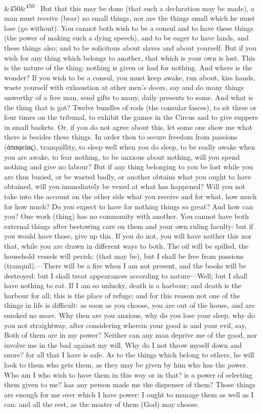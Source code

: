 \documentclass[12pt]{article}
\newcommand{\para}[1][]{\par\noindent\ifx&#1&\else\textsuperscript{\footnotesize #1}~\fi}
\begin{document}
\para[450] But that this may be done (that such a declaration may be made), a man must receive (bear) no small things, nor are the things small which he must lose (go without). You cannot both wish to be a consul and to have these things (the power of making such a dying speech), and to be eager to have lands, and these things also; and to be solicitous about slaves and about yourself. But if you wish for any thing which belongs to another, that which is your own is lost. This is the nature of the thing: nothing is given or had for nothing. And where is the wonder? If you wish to be a consul, you must keep awake, run about, kiss hands, waste yourself with exhaustion at other men's doors, say and do many things unworthy of a free man, send gifts to many, daily presents to some. And what is the thing that is got? Twelve bundles of rods (the consular fasces), to sit three or four times on the tribunal, to exhibit the games in the Circus and to give suppers in small baskets. Or, if you do not agree about this, let some one show me what there is besides these things. In order then to secure freedom from passions (ἀπαφείας), tranquillity, to sleep well when you do sleep, to be really awake when you are awake, to fear nothing, to be anxious about nothing, will you spend nothing and give no labour? But if any thing belonging to you be lost while you are thus busied, or be wasted badly, or another obtains what you ought to have obtained, will you immediately be vexed at what has happened? Will you not take into the account on the other side what you receive and for what, how much for how much? Do you expect to have for nothing things so great? And how can you? One work (thing) has no community with another. You cannot have both external things after bestowing care on them and your own ruling faculty: but if you would have those, give up this. If you do not, you will have neither this nor that, while you are drawn in different ways to both. The oil will be spilled, the household vessels will perish: (that may be), but I shall be free from passions (tranquil).—There will be a fire when I am not present, and the books will be destroyed: but I shall treat appearances according to nature—Well; but I shall have nothing to eat. If I am so unlucky, death is a harbour; and death is the harbour for all; this is the place of refuge; and for this reason not one of the things in life is difficult: as soon as you choose, you are out of the house, and are smoked no more. Why then are you anxious, why do you lose your sleep, why do you not straightway, after considering wherein your good is and your evil, say, Both of them are in my power? Neither can any man deprive me of the good, nor involve me in the bad against my will. Why do I not throw myself down and snore? for all that I have is safe. As to the things which belong to others, he will look to them who gets them, as they may be given by him who has the power. Who am I who wish to have them in this way or in that? is a power of selecting them given to me? has any person made me the dispenser of them? Those things are enough for me over which I have power: I ought to manage them as well as I can: and all the rest, as the master of them (God) may choose.
\end{document}
